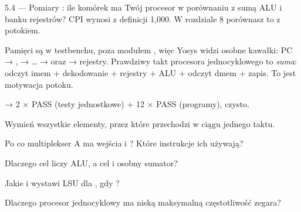 \begin{zadanie}{5.4 --- Pomiary}
: ile komórek ma Twój procesor w porównaniu z sumą ALU
i banku rejestrów? CPI wynosi z definicji 1,000. W rozdziale 8 porównasz to z
potokiem.
\end{zadanie}

\begin{uwaga}
Pamięci są w testbenchu, poza modułem , więc Yosys widzi osobne
kawałki: PC → ,  → … →  oraz
 → rejestry. Prawdziwy takt procesora jednocyklowego to
\emph{suma}: odczyt imem + dekodowanie + rejestry + ALU + odczyt dmem + zapis.
To jest motywacja potoku.
\end{uwaga}

\begin{gotowe}
 → 2 × PASS (testy jednostkowe) + 12 × PASS (programy),  czysto.
\end{gotowe}

\begin{kontrolne}
  \item Wymień wszystkie elementy, przez które przechodzi  w ciągu jednego taktu.
  \item Po co multiplekser A ma wejścia  i ? Które instrukcje ich używają?
  \item Dlaczego cel  liczy ALU, a cel  i  osobny sumator?
  \item Jakie  i  wystawi LSU dla , gdy ?
  \item Dlaczego procesor jednocyklowy ma niską maksymalną częstotliwość zegara?
\end{kontrolne}
